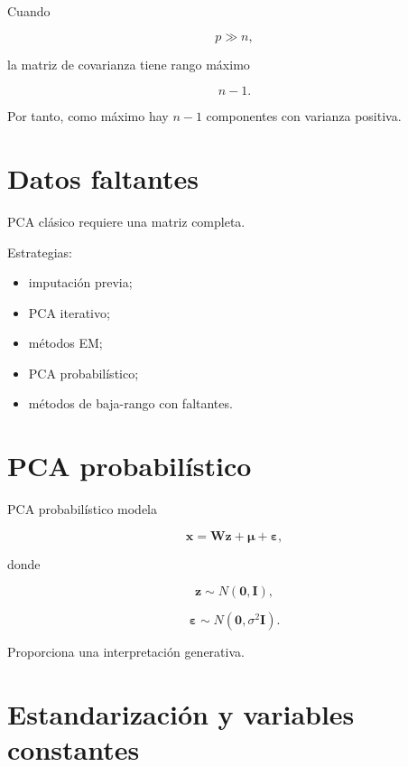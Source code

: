 \documentclass[
  spanish,
  10.5pt,
  letterpaper,
  DIV=11,
  numbers=noendperiod,
  oneside,
  open=any]{scrreprt}
\providecommand{\tightlist}{%
  \setlength{\itemsep}{0pt}\setlength{\parskip}{0pt}}
\theoremstyle{definition}
\theoremstyle{definition}
\theoremstyle{plain}
\theoremstyle{remark}
\begin{document}

Cuando

\[
p\gg n,
\]

la matriz de covarianza tiene rango máximo

\[
n-1.
\]

Por tanto, como máximo hay \(n-1\) componentes con varianza positiva.

\section*{Datos faltantes}\label{datos-faltantes}


PCA clásico requiere una matriz completa.

Estrategias:

\begin{itemize}
\tightlist
\item
  imputación previa;
\item
  PCA iterativo;
\item
  métodos EM;
\item
  PCA probabilístico;
\item
  métodos de baja-rango con faltantes.
\end{itemize}

\section*{PCA probabilístico}\label{pca-probabiluxedstico}


PCA probabilístico modela

\[
\mathbf{x}
=
\mathbf{W}\mathbf{z}
+
\boldsymbol{\mu}
+
\boldsymbol{\varepsilon},
\]

donde

\[
\mathbf{z}
\sim
N(\mathbf{0},\mathbf{I}),
\]

\[
\boldsymbol{\varepsilon}
\sim
N(\mathbf{0},\sigma^2\mathbf{I}).
\]

Proporciona una interpretación generativa.

\section*{Estandarización y variables
constantes}\label{estandarizaciuxf3n-y-variables-constantes}
\end{document}

